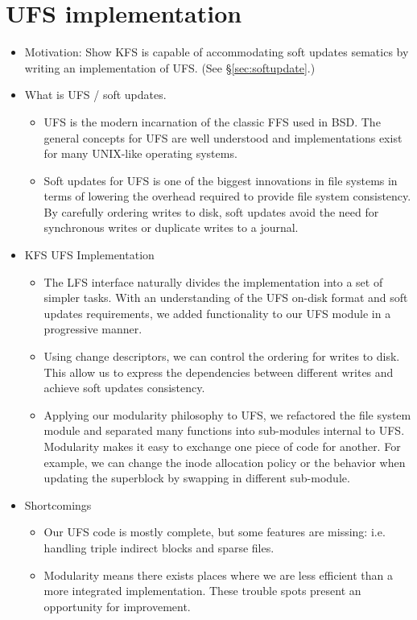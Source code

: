 \section{UFS implementation}
\label{sec:ufs}

\begin{itemize}
\item Motivation: Show KFS is capable of accommodating soft updates
  sematics by writing an implementation of UFS. (See \S\ref{sec:softupdate}.)
\item What is UFS / soft updates.
  \begin{itemize}
  \item UFS is the modern incarnation of the classic FFS used in BSD.
    The general concepts for UFS are well understood and implementations
    exist for many UNIX-like operating systems.
  \item Soft updates for UFS is one of the biggest innovations in file
    systems in terms of lowering the overhead required to provide file
    system consistency. By carefully ordering writes to disk, soft updates
    avoid the need for synchronous writes or duplicate writes to a journal.
  \end{itemize}
\item KFS UFS Implementation
  \begin{itemize}
  \item The LFS interface naturally divides the implementation into a set
    of simpler tasks. With an understanding of the UFS on-disk format and
    soft updates requirements, we added functionality to our UFS module
    in a progressive manner.
  \item Using change descriptors, we can control the ordering for writes
    to disk. This allow us to express the dependencies between different
    writes and achieve soft updates consistency.
  \item Applying our modularity philosophy to UFS, we refactored the file
    system module and separated many functions into sub-modules internal
    to UFS. Modularity makes it easy to exchange one piece of code for
    another. For example, we can change the inode allocation policy or
    the behavior when updating the superblock by swapping in different
    sub-module.
  \end{itemize}
\item Shortcomings
  \begin{itemize}
  \item Our UFS code is mostly complete, but some features are missing:
    i.e. handling triple indirect blocks and sparse files.
  \item Modularity means there exists places where we are less efficient
    than a more integrated implementation. These trouble spots present
    an opportunity for improvement.
  \end{itemize}
\end{itemize}
